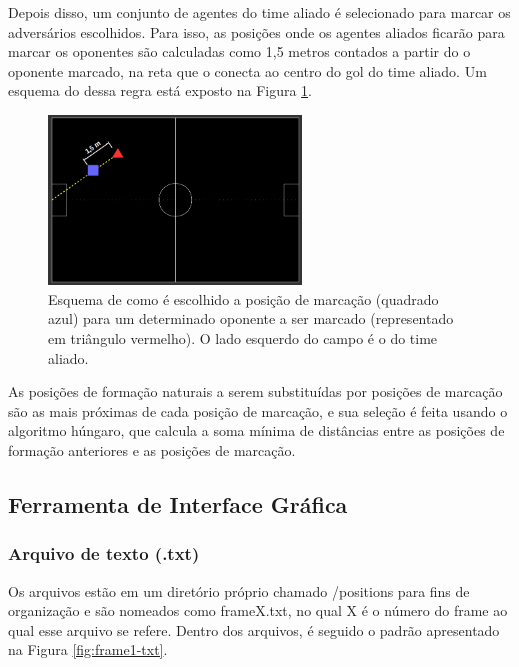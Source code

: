\documentclass[a4paper,12pt]{article}
\begin{document}
Depois disso, um conjunto de agentes do time aliado é selecionado para marcar os adversários escolhidos. Para isso, as posições onde os agentes aliados ficarão para marcar os oponentes são calculadas como 1,5 metros contados a partir do o oponente marcado, na reta que o conecta ao centro do gol do time aliado. Um esquema do dessa regra está exposto na Figura \ref{fig:marking-position}.

\begin{figure}[H]
	\centering
	\includegraphics[width=0.6\textwidth]{figures/marking-position.png}
   \caption{Esquema de como é escolhido a posição de marcação (quadrado azul) para um determinado oponente a ser marcado (representado em triângulo vermelho). O lado esquerdo do campo é o do time aliado.} \label{fig:marking-position}
\end{figure}

As posições de formação naturais a serem substituídas por posições de marcação são as mais próximas de cada posição de marcação, e sua seleção é feita usando o algoritmo húngaro, que calcula a soma mínima de distâncias entre as posições de formação anteriores e as posições de marcação.

\subsection{Ferramenta de Interface Gráfica}
\subsubsection{Arquivo de texto (.txt)}
Os arquivos estão em um diretório próprio chamado /positions para fins de organização e são nomeados como frameX.txt, no qual X é o número do frame ao qual esse arquivo se refere. Dentro dos arquivos, é seguido o padrão apresentado na Figura \ref{fig:frame1-txt}.
\end{document}
